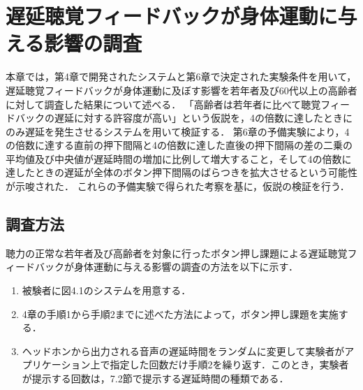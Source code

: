 \chapter{遅延聴覚フィードバックが身体運動に与える影響の調査}
本章では，第4章で開発されたシステムと第6章で決定された実験条件を用いて，遅延聴覚フィードバックが身体運動に及ぼす影響を若年者及び60代以上の高齢者に対して調査した結果について述べる．
「高齢者は若年者に比べて聴覚フィードバックの遅延に対する許容度が高い」という仮説を，4の倍数に達したときにのみ遅延を発生させるシステムを用いて検証する．
第6章の予備実験により，4の倍数に達する直前の押下間隔と4の倍数に達した直後の押下間隔の差の二乗の平均値及び中央値が遅延時間の増加に比例して増大すること，そして4の倍数に達したときの遅延が全体のボタン押下間隔のばらつきを拡大させるという可能性が示唆された．
これらの予備実験で得られた考察を基に，仮説の検証を行う．
\section{調査方法}
聴力の正常な若年者及び高齢者を対象に行ったボタン押し課題による遅延聴覚フィードバックが身体運動に与える影響の調査の方法を以下に示す．

\begin{enumerate}
  \item 被験者に図4.1のシステムを用意する．
  \item 4章の手順1から手順2までに述べた方法によって，ボタン押し課題を実施する．
  \item ヘッドホンから出力される音声の遅延時間をランダムに変更して実験者がアプリケーション上で指定した回数だけ手順2を繰り返す．このとき，実験者が提示する回数は，7.2節で提示する遅延時間の種類である．
\end{enumerate}
